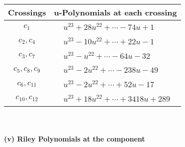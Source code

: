 \documentclass[1p]{elsarticle_modified}
\theoremstyle{definition}
\begin{document}
\begin{tabular}{m{50pt}|m{274pt}}
Crossings & \hspace{64pt}u-Polynomials at each crossing \\
\hline $$\begin{aligned}c_{1}\end{aligned}$$&$\begin{aligned}
&u^{23}+28 u^{22}+\cdots-74 u+1
\end{aligned}$\\
\hline $$\begin{aligned}c_{2},c_{4}\end{aligned}$$&$\begin{aligned}
&u^{23}-10 u^{22}+\cdots+22 u-1
\end{aligned}$\\
\hline $$\begin{aligned}c_{3},c_{7}\end{aligned}$$&$\begin{aligned}
&u^{23}- u^{22}+\cdots-64 u-32
\end{aligned}$\\
\hline $$\begin{aligned}c_{5},c_{8},c_{9}\end{aligned}$$&$\begin{aligned}
&u^{23}-2 u^{22}+\cdots-238 u-49
\end{aligned}$\\
\hline $$\begin{aligned}c_{6},c_{11}\end{aligned}$$&$\begin{aligned}
&u^{23}-2 u^{22}+\cdots+52 u-17
\end{aligned}$\\
\hline $$\begin{aligned}c_{10},c_{12}\end{aligned}$$&$\begin{aligned}
&u^{23}+18 u^{22}+\cdots+3418 u+289
\end{aligned}$\\
\hline
\end{tabular}\\~\\
\newpage\renewcommand{\arraystretch}{1}
\flushleft \textbf{(v) Riley Polynomials at the component}\newline \\
\end{document}
